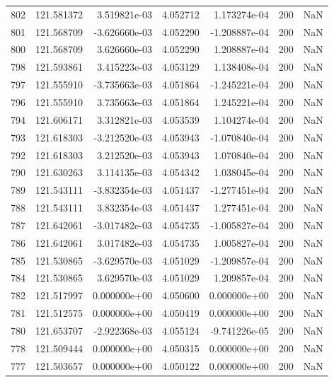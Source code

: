 \begin{tabular}{rrrrrrr}
 802 & 121.581372 &  3.519821e-03 &  4.052712 &  1.173274e-04 &         200 & NaN \\
 801 & 121.568709 & -3.626660e-03 &  4.052290 & -1.208887e-04 &         200 & NaN \\
 800 & 121.568709 &  3.626660e-03 &  4.052290 &  1.208887e-04 &         200 & NaN \\
 798 & 121.593861 &  3.415223e-03 &  4.053129 &  1.138408e-04 &         200 & NaN \\
 797 & 121.555910 & -3.735663e-03 &  4.051864 & -1.245221e-04 &         200 & NaN \\
 796 & 121.555910 &  3.735663e-03 &  4.051864 &  1.245221e-04 &         200 & NaN \\
 794 & 121.606171 &  3.312821e-03 &  4.053539 &  1.104274e-04 &         200 & NaN \\
 793 & 121.618303 & -3.212520e-03 &  4.053943 & -1.070840e-04 &         200 & NaN \\
 792 & 121.618303 &  3.212520e-03 &  4.053943 &  1.070840e-04 &         200 & NaN \\
 790 & 121.630263 &  3.114135e-03 &  4.054342 &  1.038045e-04 &         200 & NaN \\
 789 & 121.543111 & -3.832354e-03 &  4.051437 & -1.277451e-04 &         200 & NaN \\
 788 & 121.543111 &  3.832354e-03 &  4.051437 &  1.277451e-04 &         200 & NaN \\
 787 & 121.642061 & -3.017482e-03 &  4.054735 & -1.005827e-04 &         200 & NaN \\
 786 & 121.642061 &  3.017482e-03 &  4.054735 &  1.005827e-04 &         200 & NaN \\
 785 & 121.530865 & -3.629570e-03 &  4.051029 & -1.209857e-04 &         200 & NaN \\
 784 & 121.530865 &  3.629570e-03 &  4.051029 &  1.209857e-04 &         200 & NaN \\
 782 & 121.517997 &  0.000000e+00 &  4.050600 &  0.000000e+00 &         200 & NaN \\
 781 & 121.512575 &  0.000000e+00 &  4.050419 &  0.000000e+00 &         200 & NaN \\
 780 & 121.653707 & -2.922368e-03 &  4.055124 & -9.741226e-05 &         200 & NaN \\
 778 & 121.509444 &  0.000000e+00 &  4.050315 &  0.000000e+00 &         200 & NaN \\
 777 & 121.503657 &  0.000000e+00 &  4.050122 &  0.000000e+00 &         200 & NaN \\

\end{tabular}
